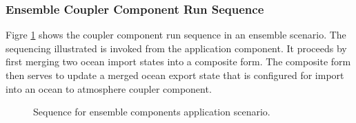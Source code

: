 \subsubsection{Ensemble Coupler Component Run Sequence}
Figre \ref{fig:EnsembleComponentsCouplerRunSequence} shows the
coupler component run sequence in an ensemble scenario. The sequencing
illustrated is invoked from the application component. It proceeds by
first merging two ocean import states into a composite form. The composite
form then serves to update a merged ocean export state that is
configured for import into an ocean to atmosphere coupler component.
\begin{figure}
\caption[{Ensemble component Run}]{Sequence for ensemble components
application scenario.\\}
\label{fig:EnsembleComponentsCouplerRunSequence}
\end{figure}

